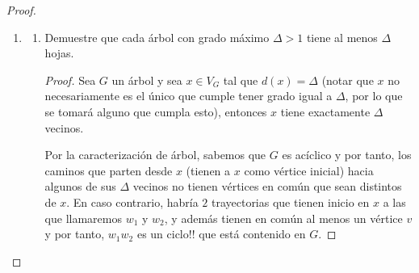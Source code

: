 \documentclass{article}
\begin{document}
\begin{enumerate}
\begin{proof}
\begin{enumerate}
      \begin{proof} (Reducción al absurdo)
        (------->) Pd G es una trayectoria $\Longrightarrow$ G es un arbol con exactamente 2 vértices de grado 1

        Pd G es una trayectoria  y G no es un árbol

        Pd G es una trayectoria  y G no es conexa o contiene un ciclo

        Caso 1 G no es conexa

        Si G no es conexa $\Longrightarrow$ Existen  u,v que pertenecen a G tal que u,v no son adyacente $\Longrightarrow$ G no puede ser una trayectoria (Lo que es una contradicción ya que G es una trayectoria)

        Caso 2 G contiene un ciclo

        Si G contiene un ciclo $\Longrightarrow$  G no es un orden lineal  $\Longrightarrow$ G no es trayectoria (Lo que es una contradicción ya que G es una trayectoria)

        Por lo tanto G es una trayectoria y G es un Árbol $\Longrightarrow$ (---tengo dudas aqui---) Existe G con tansolo 2 vertices de grado 2, pero tambien existen G con mas vertices que lo cumplen


        (<-------) Sea G un arbol con exactamente 2 vertices de grado 1  $\Longrightarrow$ G es un orden lineal por lo tanto G es una trayectoria

>>>>>>> 6bd3c03fbeea07eb7bc0af1b8233920256efe433
      \end{proof}
   

    \item \begin{enumerate}
      \item Demuestre que cada \'arbol con grado m\'aximo
        $\Delta > 1$ tiene al menos $\Delta$ hojas.

        \renewcommand\qedsymbol{QED}
        \begin{proof}
          Sea $G$ un \'arbol y sea $x \in V_G$ tal que $d(x) = \Delta$ (notar que $x$
          no necesariamente es el \'unico que cumple tener grado igual a $\Delta$, por
          lo que se tomar\'a alguno que cumpla esto), entonces $x$ tiene exactamente
          $\Delta$ vecinos.

          Por la caracterizaci\'on de \'arbol, sabemos que $G$ es ac\'iclico
          y por tanto, los caminos que parten desde $x$ (tienen a $x$
          como v\'ertice inicial) hacia algunos de sus $\Delta$ vecinos no tienen
          v\'ertices en com\'un que sean distintos de $x$. En caso contrario, habr\'ia $2$
          trayectorias que tienen inicio en $x$ a las que llamaremos $w_1$ y $w_2$, y
          adem\'as tienen en com\'un al menos un v\'ertice $v$ y por tanto, $w_1 w_2$ es
          un ciclo!! que est\'a contenido en $G$.


\end{proof}
\end{enumerate}
\end{enumerate}
\end{proof}
\end{enumerate}
\end{document}
